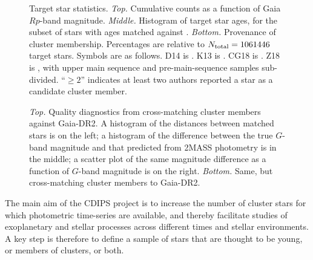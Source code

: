 \documentclass[12pt,twocolumn,tighten]{aastex62}
\begin{document}
\begin{figure}[!t]
	\begin{center}
		\leavevmode
		\vspace{-0.8cm}
		\vspace{-0.8cm}
	\end{center}
	\vspace{-0.8cm}
	\caption{
		Target star statistics.
		{\it Top.} Cumulative counts as a function of Gaia $Rp$-band
		magnitude.  
		{\it Middle.} Histogram of target star ages, for the subset of
		stars with ages matched against \citet{Kharchenko_et_al_2013}.
		{\it Bottom.} Provenance of cluster membership.  Percentages are
		relative to $N_{\rm total}=1061446$ target stars. Symbols
		are as follows.
		D14 is \citet{dias_proper_2014}.
		K13 is \citet{Kharchenko_et_al_2013}.
		CG18 is \citet{cantat-gaudin_gaia_2018}.
		Z18 is \citet{zari_3d_2018}, with upper main sequence and
		pre-main-sequence samples sub-divided.
		``$\geq 2$'' indicates at least two authors reported a star as a
		candidate cluster member.
		\label{fig:cdips_targets}
	}
\end{figure}

\begin{figure}[!t]
	\vspace{-0.8cm}
	\vspace{-0.8cm}
	\caption{
		{\it Top.} Quality diagnostics from cross-matching
		\cite{Kharchenko_et_al_2013} cluster members against Gaia-DR2.
		A histogram of the distances between matched stars is on the left; a
		histogram of the difference between the true $G$-band magnitude
		and that predicted from 2MASS photometry is in the middle; a scatter
		plot of the same magnitude difference as a function of $G$-band
		magnitude is on the right.
		{\it Bottom.} Same, but cross-matching \cite{dias_proper_2014}
		cluster members to Gaia-DR2.
	}
	\label{fig:xmatch_info}
\end{figure}

The main aim of the CDIPS project is to increase the number of cluster
stars for which photometric time-series are available, and thereby
facilitate studies of exoplanetary and stellar processes across
different times and stellar environments.  A key step is
therefore to define a sample of stars that are thought to be young, or
members of clusters, or both.
\end{document}
